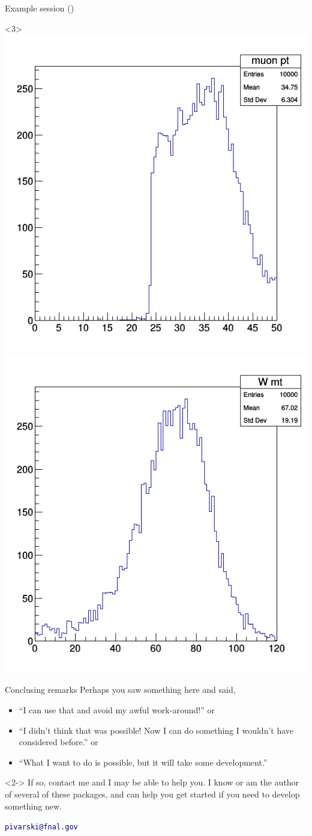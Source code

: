 \documentclass{beamer}
\begin{document}
\begin{frame}[fragile]{Example session ()}
\vspace{-3.1 cm}
\begin{uncoverenv}<3>
\mbox{ } \hfill \includegraphics[width=3 cm]{muonpt.png}\includegraphics[width=3 cm]{wmt.png}
\end{uncoverenv}
\end{frame}

\begin{frame}{Conclusing remarks}
\vfill
\vfill
Perhaps you saw something here and said,
\begin{itemize}
\item ``I can use that and avoid my awful work-around!'' or
\item ``I didn't think that was possible! Now I can do something I wouldn't have considered before.'' or
\item ``What I want to do is possible, but it will take some development.''
\end{itemize}

\vfill
\begin{uncoverenv}<2->
If so, contact me and I may be able to help you. I know or am the author of several of these packages, and can help you get started if you need to develop something new.

\vfill
\begin{center}
\textcolor{darkblue}{\tt pivarski@fnal.gov}
\end{center}
\end{uncoverenv}
\end{frame}
\end{document}
